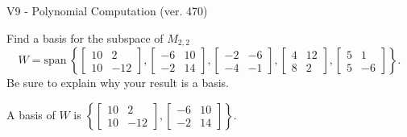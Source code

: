 \begin{exercise}
  \begin{exerciseTitle}V9 - Polynomial Computation (ver. 470)\end{exerciseTitle}
  \begin{exerciseStatement}
    Find a basis for the subspace of \(M_{2,2}\) 
\[W=\mathrm{span}\ \left\{\left[\begin{array}{cc}
10 & 2 \\
10 & -12
\end{array}\right] , \left[\begin{array}{cc}
-6 & 10 \\
-2 & 14
\end{array}\right] , \left[\begin{array}{cc}
-2 & -6 \\
-4 & -1
\end{array}\right] , \left[\begin{array}{cc}
4 & 12 \\
8 & 2
\end{array}\right] , \left[\begin{array}{cc}
5 & 1 \\
5 & -6
\end{array}\right]\right\}.\]
 Be sure to explain why your result is a basis.


  \end{exerciseStatement}
  \begin{exerciseAnswer}
   A basis of \(W\) is  \(\left\{\left[\begin{array}{cc}
10 & 2 \\
10 & -12
\end{array}\right] , \left[\begin{array}{cc}
-6 & 10 \\
-2 & 14
\end{array}\right]\right\}\).
  


  \end{exerciseAnswer}
\end{exercise}